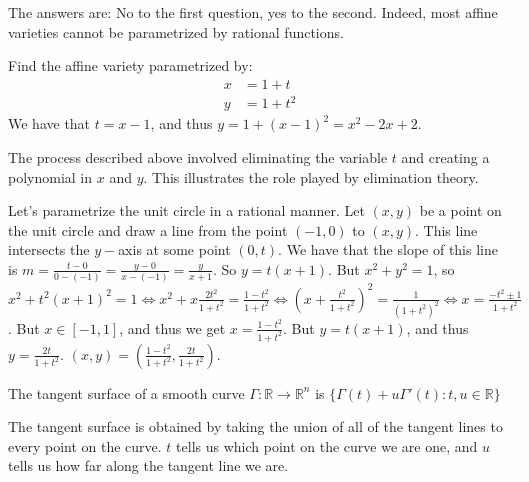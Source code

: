 \documentclass[crop=false,class=article,oneside]{standalone}
\begin{document}
            The answers are: No to the first question,
            yes to the second. Indeed, most affine varieties
            cannot be parametrized by rational functions.
            \begin{example}
                Find the affine variety parametrized by:
                \begin{align*}
                    x&=1+t\\
                    y&=1+t^{2}
                \end{align*}
                We have that $t=x-1$, and thus
                $y=1+(x-1)^{2}=x^{2}-2x+2$.
            \end{example}
            \begin{remark}
                The process described above involved
                eliminating the variable $t$ and creating
                a polynomial in $x$ and $y$. This illustrates
                the role played by elimination theory.
            \end{remark}
            \begin{example}
                Let's parametrize the unit circle in a
                rational manner. Let $(x,y)$ be a point on
                the unit circle and draw a line from the
                point $(-1,0)$ to $(x,y)$. This line intersects
                the $y-$axis at some point $(0,t)$. We have
                that the slope of this line is
                $m=\frac{t-0}{0-(-1)}%
                 =\frac{y-0}{x-(-1)}=\frac{y}{x+1}$.
                So $y=t(x+1)$. But $x^{2}+y^{2}=1$,
                so
                $x^2+t^{2}(x+1)^{2}%
                 =1\Leftrightarrow x^{2}+x\frac{2t^{2}}{1+t^{2}}%
                 =\frac{1-t^2}{1+t^2}%
                 \Leftrightarrow(x+\frac{t^{2}}{1+t^{2}})^{2}%
                 =\frac{1}{(1+t^{2})^{2}}%
                 \Leftrightarrow x=\frac{-t^{2}\pm 1}{1+t^{2}}$.
                But $x\in [-1,1]$, and thus we get
                $x=\frac{1-t^2}{1+t^2}$.
                But $y=t(x+1)$, and thus
                $y=\frac{2t}{1+t^2}$.
                $(x,y)=(\frac{1-t^{2}}{1+t^{2}},\frac{2t}{1+t^{2}})$.
            \end{example}
            \begin{definition}
                The tangent surface of a smooth curve
                $\Gamma:\mathbb{R}\rightarrow\mathbb{R}^n$
                is $\{\Gamma(t)+u\Gamma'(t):t,u\in \mathbb{R}\}$
            \end{definition}
            \begin{remark}
                The tangent surface is obtained by
                taking the union of all of the tangent
                lines to every point on the curve.
                $t$ tells us which point on the curve we are
                one, and $u$ tells us how far along the
                tangent line we are.
            \end{remark}
\end{document}
